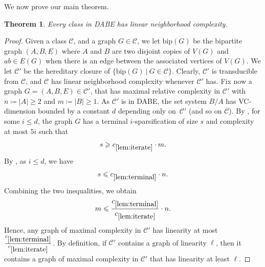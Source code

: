 \documentclass[11pt]{article}
\newtheorem{theorem}{Theorem}
\theoremstyle{definition}
\newcommand{\CC}{{\mathscr C}}
\newcommand{\inducedSS}[2]{#1/#2}%
\renewcommand{\le}{\leqslant}
\renewcommand{\ge}{\geqslant}
\begin{document}
We now prove our main theorem.

\begin{theorem}\label{thm:main}
Every class in DABE has linear neighborhood complexity.
\end{theorem}
\begin{proof}
Given a class $\CC$, and a graph $G \in \CC$, we let $\text{bip}(G)$ be the bipartite graph $(A, B, E)$ where $A$ and $B$ are two disjoint copies of $V(G)$ and $ab \in E(G)$ when there is an edge between the associated vertices of $V(G)$.
We let $\CC'$ be the hereditary closure of $\{ \text{bip} (G) ~|~ G \in \CC \}$.
Clearly, $\CC'$ is transducible from $\CC$, and $\CC$ has linear neighborhood complexity whenever $\CC'$ has.
Fix now a graph $G=(A,B,E)\in\CC'$, that has maximal relative complexity in $\CC'$ with $n\coloneqq |A| \ge 2$ and $m\coloneqq |B| \ge 1$.
As $\CC'$ is in DABE, the set system $\inducedSS{B}{A}$ has
VC-dimension bounded by a constant $d$ depending only on~$\CC'$ (and so on $\CC$).
By , for some $i\le d$, the graph $G$ has a
terminal $i$-sparsification of size $s$ and complexity at most $5i$ such
that
\[
  s\ge c_{\ref{lem:iterate}} \cdot m.
\]
By , as $i\le d$, we have
\[
  s
  \le c_{\ref{lem:terminal}} \cdot n.
\]
Combining the two inequalities, we obtain
\[
  m
  \le \frac{c_{\ref{lem:terminal}}}{c_{\ref{lem:iterate}}} \cdot n.
\]
Hence, any graph of maximal complexity in $\CC'$ has linearity at most $\frac{c_{\ref{lem:terminal}}}{c_{\ref{lem:iterate}}}$.
By definition, if $\CC'$ contains a graph of linearity $\ell$, then it contains a graph of maximal complexity in $\CC'$ that has linearity at least $\ell$.

\end{proof}
\end{document}
